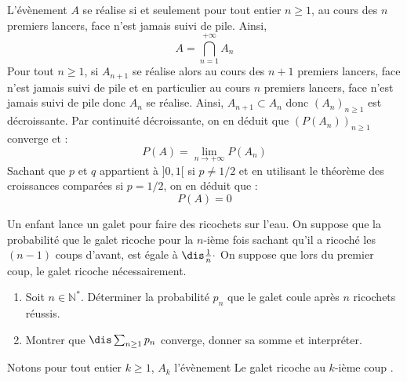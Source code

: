 \documentclass[a4paper,10pt]{report}
\begin{document}
\begin{enumerate}
\medskip

\noindent L'évènement $A$ se réalise si et seulement pour tout entier $n \geq 1$, au cours des $n$ premiers lancers, face n'est jamais suivi de pile. Ainsi,
$$ A = \bigcap_{n=1}^{+ \infty} A_n$$
Pour tout $n \geq 1$, si $A_{n+1}$ se réalise alors au cours des $n+1$ premiers lancers, face n'est jamais suivi de pile et en particulier au cours $n$ premiers lancers, face n'est jamais suivi de pile donc $A_n$ se réalise. Ainsi, $A_{n+1} \subset A_n$ donc $(A_n)_{n \geq 1}$ est décroissante. Par continuité décroissante, on en déduit que $(P(A_n))_{n \geq 1}$ converge et :
$$ P(A) = \lim_{n \rightarrow + \infty} P(A_n)$$
Sachant que $p$ et $q$ appartient à $]0,1[$ si $p \neq 1/2$ et en utilisant le théorème des croissances comparées si $p=1/2$, on en déduit que :
$$ P(A)=0$$
\end{enumerate}

\begin{Exa} Un enfant lance un galet pour faire des ricochets sur l'eau. On suppose que la probabilité que le galet ricoche pour la $n$-ième fois sachant qu'il a ricoché les $(n-1)$ coups d'avant, est égale à $\dis \frac{1}{n}\cdot$ On suppose que lors du premier coup, le galet ricoche nécessairement.
\begin{enumerate}
\item Soit $n \in \mathbb{N}^*$. Déterminer la probabilité $p_n$ que le galet coule après $n$ ricochets réussis.
\item Montrer que $\dis \sum_{n \geq 1} p_n$ converge, donner sa somme et interpréter.
\end{enumerate}
\end{Exa}

\corr Notons pour tout entier $k \geq 1$, $A_k$ l'évènement \og Le galet ricoche au $k$-ième coup \fg.
\end{document}
